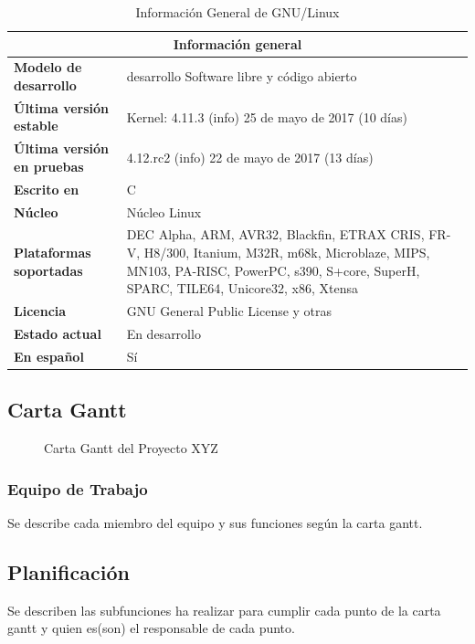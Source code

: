 \documentclass[letter,12pt]{report}
\begin{document}
\begin{table}[hbt]
\begin{center}
\begin{tabular}{|l|p{10cm}|}\hline
\multicolumn{2}{|c|}{\textbf{Información general}}\\
\hline
\textbf{Modelo de desarrollo}&desarrollo	Software libre y código abierto\\
\textbf{Última versión estable}&Kernel: 4.11.3 (info) 25 de mayo de 2017 (10 días)\\
\textbf{Última versión en pruebas}&	4.12.rc2 (info) 22 de mayo de 2017 (13 días)\\
\textbf{Escrito en}&	C\\
\textbf{Núcleo}&	Núcleo Linux\\
\textbf{Plataformas soportadas}	& DEC Alpha, ARM, AVR32, Blackfin, ETRAX CRIS, FR-V, H8/300, Itanium, M32R, m68k, Microblaze, MIPS, MN103, PA-RISC, PowerPC, s390, S+core, SuperH, SPARC, TILE64, Unicore32, x86, Xtensa\\
\textbf{Licencia}	&GNU General Public License y otras\\
\textbf{Estado actual}	&En desarrollo\\
\textbf{En español}	&Sí\\
\hline
\end{tabular}
\end{center}
\caption{Información General de GNU/Linux}
\label{t:info}
\end{table}

\begin{landscape}
\subsection{Carta Gantt}\label{gantt}
\begin{figure}[hbt]
  \centering
  \caption{Carta Gantt del Proyecto XYZ}
  \label{gantt}
\end{figure}
\end{landscape}

\subsubsection{Equipo de Trabajo}
Se describe cada miembro del equipo y sus funciones según la carta gantt.

\subsection{Planificación}
Se describen las subfunciones ha realizar para cumplir cada punto de la carta gantt y quien es(son) el responsable de cada punto.
\end{document}
